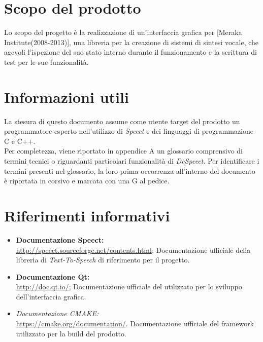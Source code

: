 \documentclass[openany,12pt,a4paper]{report}
\begin{document}
	\section{Scopo del prodotto}
	
	Lo scopo del progetto è la realizzazione di un’interfaccia grafica per  [Meraka Institute(2008-2013)], una libreria per la creazione di sistemi di sintesi vocale, che agevoli l’ispezione del suo stato interno durante il funzionamento e la scrittura di test per le sue funzionalità.
	
	\section{Informazioni utili}
	
	La stesura di questo documento assume come utente target del prodotto un programmatore esperto nell'utilizzo di \textit{Speect} e dei linguaggi di programmazione C e C++. \\
	\noindent Per completezza, viene riportato in appendice A un glossario comprensivo di termini tecnici o riguardanti particolari funzionalità di \textit{DeSpeect}. Per identificare i termini presenti nel glossario, la loro prima occorrenza all’interno del documento è riportata in corsivo e marcata con una G al pedice. 
	

	
	\section{Riferimenti informativi}

	\begin{itemize}
		\item \textbf{Documentazione Speect:} \\
		\url{http://speect.sourceforge.net/contents.html};
		\subitem Documentazione ufficiale della libreria di \textit{Text-To-Speech} di riferimento per il progetto.
		
		\item \textbf{Documentazione Qt:} \\
		\url{http://doc.qt.io/};
		\subitem Documentazione ufficiale del  utilizzato per lo sviluppo dell'interfaccia grafica.
		
		\item \textit{Documentazione CMAKE:} \\
		\url{https://cmake.org/documentation/}.
		\subitem Documentazione ufficiale del framework utilizzato per la build del prodotto. 
	\end{itemize}
\end{document}
